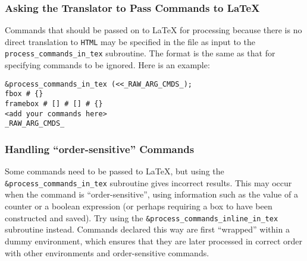 \subsubsection{Asking the Translator to Pass Commands to \LaTeX\label{pass}}%
\html{\\}%
Commands that should be passed on to \LaTeX{}  for processing because
there is no direct translation to \texttt{HTML} may be specified in the 
file as input to the \verb|process_commands_in_tex| subroutine.
The format is the same as that for specifying commands to be ignored.
Here is an example:
\begin{small}
\begin{verbatim}
&process_commands_in_tex (<<_RAW_ARG_CMDS_);
fbox # {}
framebox # [] # [] # {}
<add your commands here>
_RAW_ARG_CMDS_
\end{verbatim}
\end{small}


\subsubsection{Handling ``order-sensitive'' Commands\label{sensit}}%
%
%
%
Some commands need to be passed to \LaTeX, but using the 
\verb|&process_commands_in_tex| subroutine gives incorrect results. 
This may occur when the command is ``order-sensitive'',
using information such as the value of a counter or a boolean expression 
(or perhaps requiring a box to have been constructed and saved).
Try using the \verb|&process_commands_inline_in_tex| subroutine instead.
Commands declared this way are first ``wrapped'' within a dummy environment,
which ensures that they are later processed in correct order with other 
environments and order-sensitive commands.

